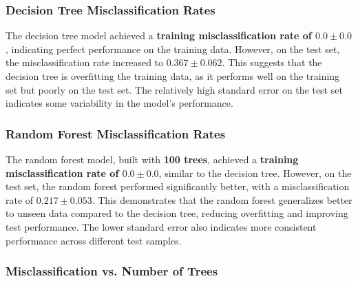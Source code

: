 \documentclass[fleqn,moreauthors,10pt]{ds_report}
\begin{document}
\subsubsection*{Decision Tree Misclassification Rates}

The decision tree model achieved a \textbf{training misclassification rate of \(0.0 \pm 0.0\)}, indicating perfect performance on the training data. However, on the test set, the misclassification rate increased to \(\mathbf{0.367 \pm 0.062}\). This suggests that the decision tree is overfitting the training data, as it performs well on the training set but poorly on the test set. The relatively high standard error on the test set indicates some variability in the model's performance.


\subsubsection*{Random Forest Misclassification Rates}

The random forest model, built with \textbf{100 trees}, achieved a \textbf{training misclassification rate of \(0.0 \pm 0.0\)}, similar to the decision tree. However, on the test set, the random forest performed significantly better, with a misclassification rate of \(\mathbf{0.217 \pm 0.053}\). This demonstrates that the random forest generalizes better to unseen data compared to the decision tree, reducing overfitting and improving test performance. The lower standard error also indicates more consistent performance across different test samples.

\subsubsection*{Misclassification vs. Number of Trees}
\end{document}
